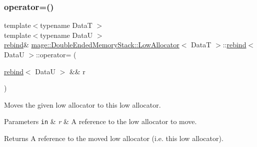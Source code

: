 \subsubsection{\texorpdfstring{operator=()}{operator=()}\hspace{0.1cm}{\footnotesize\ttfamily [2/2]}}
{\footnotesize\ttfamily template$<$typename DataT $>$ \\
template$<$typename DataU $>$ \\
\hyperlink{structmage_1_1_double_ended_memory_stack_1_1_low_allocator_1_1rebind}{rebind}\& \hyperlink{structmage_1_1_double_ended_memory_stack_1_1_low_allocator}{mage\+::\+Double\+Ended\+Memory\+Stack\+::\+Low\+Allocator}$<$ DataT $>$\+::\hyperlink{structmage_1_1_double_ended_memory_stack_1_1_low_allocator_1_1rebind}{rebind}$<$ DataU $>$\+::operator= (\begin{DoxyParamCaption}\item[{\hyperlink{structmage_1_1_double_ended_memory_stack_1_1_low_allocator_1_1rebind}{rebind}$<$ DataU $>$ \&\&}]{r }\end{DoxyParamCaption})\hspace{0.3cm}{\ttfamily [delete]}}

Moves the given low allocator to this low allocator.


\begin{DoxyParams}[1]{Parameters}
\mbox{\tt in}  & {\em r} & A reference to the low allocator to move. \\
\hline
\end{DoxyParams}
\begin{DoxyReturn}{Returns}
A reference to the moved low allocator (i.\+e. this low allocator). 
\end{DoxyReturn}
